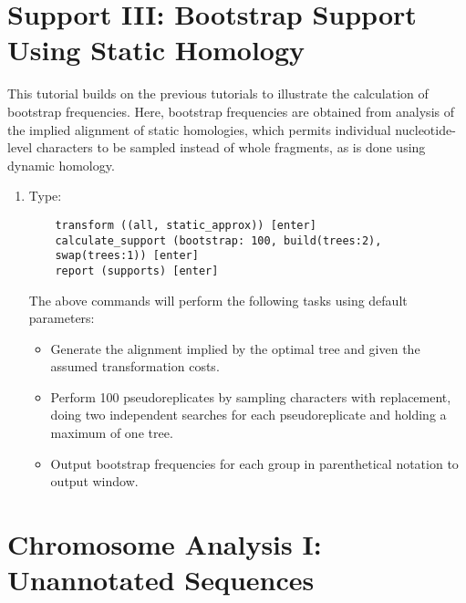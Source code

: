 \section[Bootstrap Support with Static Homologies]{Support III: Bootstrap Support Using Static Homology}

This tutorial builds on the previous tutorials to illustrate the calculation of 
bootstrap frequencies. Here, bootstrap frequencies are obtained from analysis of 
the implied alignment of static homologies, which permits individual nucleotide-
level characters to be sampled instead of whole fragments, as is done using 
dynamic homology. 
\begin{enumerate}
\item Type:
    \begin{verbatim}
    transform ((all, static_approx)) [enter]
    calculate_support (bootstrap: 100, build(trees:2), 
    swap(trees:1)) [enter]
    report (supports) [enter]
    \end{verbatim}

The above commands will perform the following tasks using default parameters:
\begin{itemize}
\item Generate the alignment implied by the optimal tree and given the assumed 
transformation costs. 
\item Perform 100 pseudoreplicates by sampling characters with replacement, 
doing two independent searches for each pseudoreplicate and holding a 
maximum of one tree. 
\item Output bootstrap frequencies for each group in parenthetical notation to 
\poy output window.
\end{itemize}
\end{enumerate}

\section[Chromosome Analysis]{Chromosome Analysis I: Unannotated Sequences}

